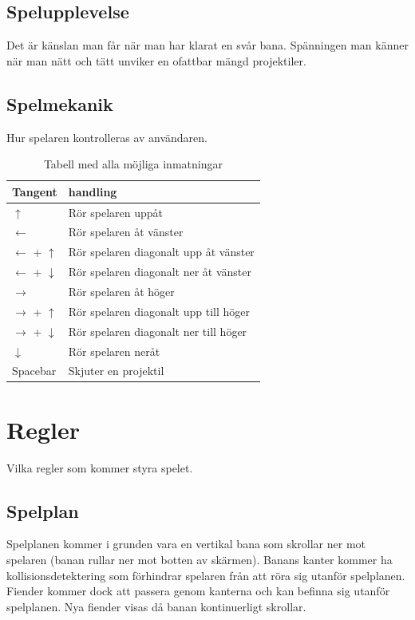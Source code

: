 \documentclass{TDP005mall}
\begin{document}
\subsection{Spelupplevelse}
Det är känslan man får när man har klarat en svår bana.
Spänningen man känner när man nätt och tätt unviker en ofattbar mängd projektiler.

\subsection{Spelmekanik}
Hur spelaren kontrolleras av användaren.
\begin{table}[H]
\caption{Tabell med alla möjliga inmatningar}
\begin{tabularx}{\linewidth}{|l|X|}
\hline
  Tangent & handling \\\hline
  $\uparrow$ & Rör spelaren uppåt \\\hline
  $\leftarrow$ & Rör spelaren åt vänster \\\hline
  $\leftarrow$ + $\uparrow$ & Rör spelaren diagonalt upp åt vänster \\\hline
  $\leftarrow$ + $\downarrow$ & Rör spelaren diagonalt ner åt vänster \\\hline
  $\rightarrow$ & Rör spelaren åt höger \\\hline
  $\rightarrow$ + $\uparrow$ & Rör spelaren diagonalt upp till höger \\\hline
  $\rightarrow$ + $\downarrow$ & Rör spelaren diagonalt ner till höger \\\hline
  $\downarrow$ & Rör spelaren neråt \\\hline
  Spacebar & Skjuter en projektil \\\hline  
\end{tabularx}
\end{table}
\clearpage
\section{Regler}
Vilka regler som kommer styra spelet.
\subsection{Spelplan}

Spelplanen kommer i grunden vara en vertikal bana som skrollar ner mot spelaren (banan rullar ner mot botten av skärmen).
Banans kanter kommer ha kollisionsdetektering som förhindrar spelaren från att röra sig utanför spelplanen.
Fiender kommer dock att passera genom kanterna och kan befinna sig utanför spelplanen. Nya fiender visas då banan kontinuerligt skrollar.
\end{document}
